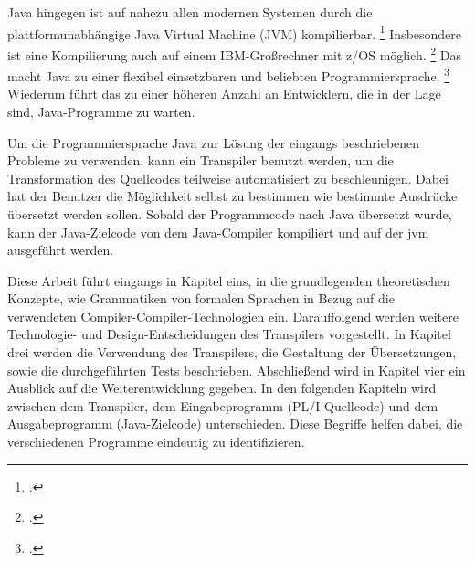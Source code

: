 Java hingegen ist auf nahezu allen modernen Systemen durch die plattformunabhängige Java Virtual Machine (JVM) kompilierbar. \footcite[Vgl. ][]{jvm}
Insbesondere ist eine Kompilierung auch auf einem IBM-Großrechner mit z/OS möglich. \footcite[Vgl. ][]{zos} Das macht Java zu einer flexibel einsetzbaren und beliebten Programmiersprache. \footcite[Vgl. ][]{tiobe} Wiederum führt das zu einer höheren Anzahl an Entwicklern, die in der Lage sind, Java-Programme zu warten.

Um die Programmiersprache Java zur Lösung der eingangs beschriebenen Probleme zu verwenden, kann ein Transpiler benutzt werden, um die Transformation des Quellcodes teilweise automatisiert zu beschleunigen. 
Dabei hat der Benutzer die Möglichkeit selbst zu bestimmen wie bestimmte Ausdrücke übersetzt werden sollen. Sobald der Programmcode nach Java übersetzt wurde, kann der Java-Zielcode von dem Java-Compiler kompiliert und auf der \ac{jvm} ausgeführt werden.

Diese Arbeit führt eingangs in Kapitel eins, in die grundlegenden theoretischen Konzepte, wie Grammatiken von formalen Sprachen in Bezug auf die verwendeten Compiler-Compiler-Technologien ein. Darauffolgend werden weitere Technologie- und Design-Entscheidungen des Transpilers vorgestellt. In Kapitel drei werden die Verwendung des Transpilers, die Gestaltung der Übersetzungen, sowie die durchgeführten Tests beschrieben. Abschließend wird in Kapitel vier ein Ausblick auf die Weiterentwicklung gegeben.
In den folgenden Kapiteln wird zwischen dem Transpiler, dem Eingabeprogramm (PL/I-Quellcode) und dem Ausgabeprogramm (Java-Zielcode) unterschieden. Diese Begriffe helfen dabei, die verschiedenen Programme eindeutig zu identifizieren. 


     



